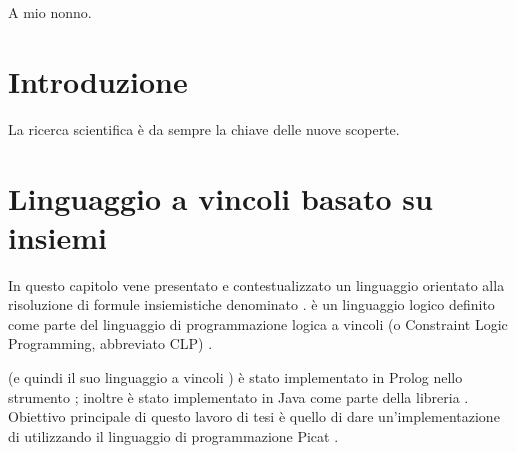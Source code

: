 \documentclass[12pt,a4paper,openright]{book} %
\newenvironment{dedication}                   %
  {%
   \thispagestyle{empty}%
   \vspace*{\stretch{1}}%
   \itshape             %
   \raggedleft          %
  }
  {\par %
   \vspace{\stretch{3}} %
   \clearpage           %
  }
\begin{document}
\thispagestyle{empty}
\cleardoublepage

\begin{dedication}
A mio nonno.
\end{dedication}

\thispagestyle{empty}



\tableofcontents
\listoffigures
\listofalgorithms




\chapter*{Introduzione}
\label{ch:intro}

La ricerca scientifica è da sempre la chiave delle nuove scoperte. 
\thispagestyle{empty}
\thispagestyle{empty}



\chapter{Linguaggio a vincoli basato su insiemi}
\label{ch:clpbasedlang}

\minitoc

In questo capitolo vene presentato e contestualizzato un linguaggio
orientato alla risoluzione di formule insiemistiche denominato
\lset{}. \lset{} è un linguaggio logico definito come parte del
linguaggio di programmazione logica a vincoli (o Constraint Logic
Programming, abbreviato CLP) \clpset{}.

\clpset{} (e quindi il suo linguaggio a vincoli \lset{}) è stato
implementato in Prolog nello strumento \setlog{} \cite{SetLog};
inoltre \lset{} è stato implementato in Java come parte della libreria
\jsetl{} \cite{JSetL}. Obiettivo principale di questo lavoro di tesi è
quello di dare un’implementazione di \lset{} utilizzando il linguaggio
di programmazione Picat \cite{PicatLang}.
\end{document}
